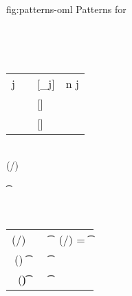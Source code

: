 \documentclass[acmsmall,screen,nonacm,review]{acmart}
\begin{document}
\begin{mathparfig}
  {fig:patterns-oml}
  {Patterns for \OML}
  \begin{bnfgrammar}
    \\
    \entry[Constraints]{\c}{
      \dots
      \and \labenv(\elab/\ct) \leq \tone \to \ttwo
      \and \labenv(\elab/\T) \leq \tone \to \ttwo
      \andcr \cscm \leq \t
      \and \ts \leq \t
      \andcr \x \leq \cscm
      \and \x \leq \ts
    }
 \end{bnfgrammar}
  \\
  \newcommand{\Mrule}[4][]{{#2} \Matches {#3} &\eqdef& {#4} & #1}
  \begin{tabular}{RCLL}
    \Mrule[ n \geq j]
      {\cpatprod \tv j}
      {\shapp[\any \tvcs \Pi\iton \tvcs] \tys}
      {[\tv \is \ty_j]}
    \\[1ex]
    \Mrule
      {\cpatrcd \ct}
      {\shapp[\any \tvcs \Tapp \tvcs] \tys}
      {[\ct \is \T]}
    \\[1ex]
    \Mrule
      {\cpatpoly \cscm}
      {\shapp[\any \tvcs \tpoly \ts] \tys}
      {[\cscm \is \ts \where{\tvcs \is \tys}]}
  \end{tabular}
  \\
    {\semenv \th \labenv(\elab/\ct) \leq \tone \to \ttwo}

    {\semenv \th \cscm \leq \t}

    {\semenv \th \x \leq \cscm}
  \\
  \newcommand{\Srule}[3][]{{#2} &\eqdef& {#3} & {#1}}
  \begin{tabular}{RCLL}
    \Srule[ \labenv(\elab/\T) = \tfor \tvs \t \to \Tapp \tvs]
      {\labenv(\elab/\T) \leq \tone \to \ttwo}
      {\cexists \tvs \cunif \tone \t \cand \cunif \ttwo {\Tapp \tvs}}
    \\[1ex]
    \Srule
      {(\tfor \tvs \tp) \leq \t}
      {\cexists \tvs \cunif \tp \t}
    \\[1ex]
    \Srule
      {\x \leq (\tfor \tvs \t)}
      {\cfor \tvs \capp \x \t}
  \end{tabular}

\end{mathparfig}


\end{document}
